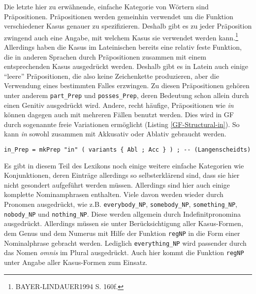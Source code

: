 \documentclass[12pt,abstract=on,titlepage,bibliography=totoc,ngerman,listof=totoc]{scrreprt}
\begin{document}
Die letzte hier zu erwähnende, einfache Kategorie von Wörtern sind Präpositionen. Präpositionen werden gemeinhin verwendet um die Funktion verschiedener Kasus genauer zu spezifizieren. Deshalb gibt es zu jeder Präposition zwingend auch eine Angabe, mit welchem Kasus sie verwendet werden kann.\footnote{BAYER-LINDAUER1994 S. 160f.} Allerdings haben die Kasus im Lateinischen bereits eine relativ feste Funktion, die in anderen Sprachen durch Präpositionen zusammen mit einem entsprechenden Kasus ausgedrückt werden. Deshalb gibt es in Latein auch einige ``leere'' Präpositionen, die also keine Zeichenkette produzieren, aber die Verwendung eines bestimmten Falles erzwingen. Zu diesen Präpositionen gehören unter anderem \texttt{part\_Prep} und \texttt{posses\_Prep}, deren Bedeutung schon allein durch einen Genitiv ausgedrückt wird. Andere, recht häufige, Präpositionen wie \textit{in} können dagegen auch mit mehreren Fällen benutzt werden. Dies wird in GF durch sogenannte freie Variationen ermöglicht (Listing \ref{GF-Structural-in}). So kann \textit{in} sowohl zusammen mit Akkusativ oder Ablativ gebraucht werden.
\begin{lstlisting}[float=ht,label={GF-Structural-in},caption={Beispiel für freie Variation}]
in_Prep = mkPrep "in" ( variants { Abl ; Acc } ) ; -- (Langenscheidts)
\end{lstlisting}
Es gibt in diesem Teil des Lexikons noch einige weitere einfache Kategorien wie Konjunktionen, deren Einträge allerdings so selbsterklärend sind, dass sie hier nicht gesondert aufgeführt werden müssen.
Allerdings sind hier auch einige komplette Nominamphrasen enthalten. Viele davon werden wieder durch Pronomen ausgedrückt, wie z.B. \texttt{everybody\_NP}, \texttt{somebody\_NP}, \texttt{something\_NP}, \texttt{nobody\_NP} und \texttt{nothing\_NP}. Diese werden allgemein durch Indefinitpronomina ausgedrückt. Allerdings müssen sie unter Berücksichtigung aller Kasus-Formen, dem Genus und dem Numerus mit Hilfe der Funktion \texttt{regNP} in die Form einer Nominalphrase gebracht werden. Lediglich \texttt{everything\_NP} wird passender durch das Nomen \textit{omnis} im Plural ausgedrückt. Auch hier kommt die Funktion \texttt{regNP} unter Angabe aller Kasus-Formen zum Einsatz.
\FloatBarrier
\end{document}
